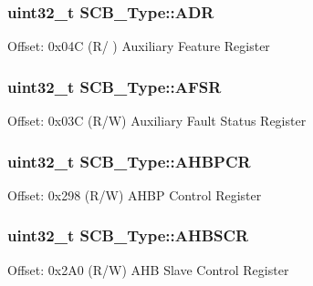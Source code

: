 \subsubsection[{\texorpdfstring{A\+DR}{ADR}}]{ uint32\+\_\+t S\+C\+B\+\_\+\+Type\+::\+A\+DR}\hypertarget{struct_s_c_b___type_aaedf846e435ed05c68784b40d3db2bf2}{}\label{struct_s_c_b___type_aaedf846e435ed05c68784b40d3db2bf2}
Offset\+: 0x04C (R/ ) Auxiliary Feature Register 
\subsubsection[{\texorpdfstring{A\+F\+SR}{AFSR}}]{ uint32\+\_\+t S\+C\+B\+\_\+\+Type\+::\+A\+F\+SR}\hypertarget{struct_s_c_b___type_aeb77053c84f49c261ab5b8374e8958ef}{}\label{struct_s_c_b___type_aeb77053c84f49c261ab5b8374e8958ef}
Offset\+: 0x03C (R/W) Auxiliary Fault Status Register 
\subsubsection[{\texorpdfstring{A\+H\+B\+P\+CR}{AHBPCR}}]{ uint32\+\_\+t S\+C\+B\+\_\+\+Type\+::\+A\+H\+B\+P\+CR}\hypertarget{struct_s_c_b___type_aa7154549803e08073983216c159f74e3}{}\label{struct_s_c_b___type_aa7154549803e08073983216c159f74e3}
Offset\+: 0x298 (R/W) A\+H\+BP Control Register 
\subsubsection[{\texorpdfstring{A\+H\+B\+S\+CR}{AHBSCR}}]{ uint32\+\_\+t S\+C\+B\+\_\+\+Type\+::\+A\+H\+B\+S\+CR}\hypertarget{struct_s_c_b___type_ae1aa2246b75741ae5a7a965a66fa8d64}{}\label{struct_s_c_b___type_ae1aa2246b75741ae5a7a965a66fa8d64}
Offset\+: 0x2\+A0 (R/W) A\+HB Slave Control Register 
